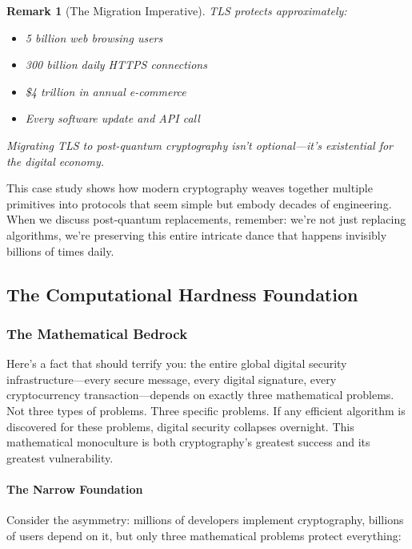 \documentclass[11pt,a4paper]{article}
\newtheorem{remark}{Remark}
\begin{document}
\begin{remark}[The Migration Imperative]
TLS protects approximately:
\begin{itemize}
    \item 5 billion web browsing users
    \item 300 billion daily HTTPS connections
    \item \$4 trillion in annual e-commerce
    \item Every software update and API call
\end{itemize}
Migrating TLS to post-quantum cryptography isn't optional---it's existential for the digital economy.
\end{remark}

This case study shows how modern cryptography weaves together multiple primitives into protocols that seem simple but embody decades of engineering. When we discuss post-quantum replacements, remember: we're not just replacing algorithms, we're preserving this entire intricate dance that happens invisibly billions of times daily.

\subsection{The Computational Hardness Foundation}
\label{sec:hardness}

\subsubsection{The Mathematical Bedrock}

Here's a fact that should terrify you: the entire global digital security infrastructure---every secure message, every digital signature, every cryptocurrency transaction---depends on exactly three mathematical problems. Not three types of problems. Three specific problems. If any efficient algorithm is discovered for these problems, digital security collapses overnight. This mathematical monoculture is both cryptography's greatest success and its greatest vulnerability.

\paragraph{The Narrow Foundation}

Consider the asymmetry: millions of developers implement cryptography, billions of users depend on it, but only three mathematical problems protect everything:
\end{document}
